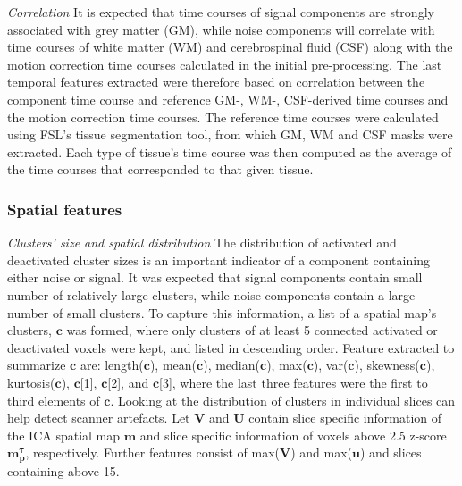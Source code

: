 \textit{Correlation} It is expected that time courses of signal components are strongly associated with grey matter (GM), while noise components will correlate with time courses of white matter (WM) and cerebrospinal fluid (CSF) along with the motion correction time courses calculated in the initial pre-processing. The last temporal features extracted were therefore based on correlation between the component time course and reference GM-, WM-, CSF-derived time courses and the motion correction time courses. The reference time courses were calculated using FSL’s tissue segmentation tool, from which GM, WM and CSF masks were extracted. Each type of tissue’s time course was then computed as the average of the time courses that corresponded to that given tissue. \cite{Salimi-Khorshidi2014}

\subsubsection{Spatial features}
\textit{Clusters’ size and spatial distribution} The distribution of activated and deactivated cluster sizes is an important indicator of a component containing either noise or signal. It was expected that signal components contain small number of relatively large clusters, while noise components contain a large number of small clusters. To capture this information, a list of a spatial map’s clusters, $\mathbf{c}$ was formed, where only clusters of at least 5 connected activated or deactivated voxels were kept, and listed in descending order. Feature extracted to summarize $\mathbf{c}$ are: length($\mathbf{c}$), mean($\mathbf{c}$), median($\mathbf{c}$), max($\mathbf{c}$), var($\mathbf{c}$), skewness($\mathbf{c}$), kurtosis($\mathbf{c}$), $\mathbf{c}$[1], $\mathbf{c}$[2], and $\mathbf{c}$[3], where the last three features were the first to third elements of $\mathbf{c}$.
Looking at the distribution of clusters in individual slices can help detect scanner artefacts. Let $\mathbf{V}$ and $\mathbf{U}$ contain slice specific information of the ICA spatial map $\mathbf{m}$ and slice specific information of voxels above 2.5 z-score $\mathbf{m^{\tau}_{p}}$, respectively. Further features consist of max($\mathbf{V}$) and max($\mathbf{u}$) and slices containing above 15. %
